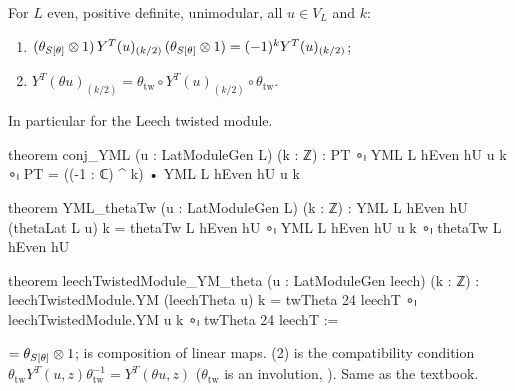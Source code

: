 \begin{theorem}\label{ch08:thm:thetastable}
For $L$ even, positive definite, unimodular, all $u\in V_L$ and $k$:
\begin{enumerate}
\item $(\theta_{S[\theta]}\otimes1)\,Y^T(u)_{(k/2)}\,(\theta_{S[\theta]}\otimes1)=(-1)^kY^T(u)_{(k/2)}$;
\item $Y^T(\theta u)_{(k/2)}=\theta_{\mathrm{tw}}\circ Y^T(u)_{(k/2)}\circ\theta_{\mathrm{tw}}$.
\end{enumerate}
In particular for the Leech twisted module.
\end{theorem}
\begin{leancode}
theorem conj_YML (u : LatModuleGen L) (k : ℤ) :
    PT ∘ₗ YML L hEven hU u k ∘ₗ PT = ((-1 : ℂ) ^ k) • YML L hEven hU u k

theorem YML_thetaTw (u : LatModuleGen L) (k : ℤ) :
    YML L hEven hU (thetaLat L u) k
      = thetaTw L hEven hU ∘ₗ YML L hEven hU u k ∘ₗ thetaTw L hEven hU

theorem leechTwistedModule_YM_theta (u : LatModuleGen leech) (k : ℤ) :
    leechTwistedModule.YM (leechTheta u) k
      = twTheta 24 leechT ∘ₗ leechTwistedModule.YM u k ∘ₗ twTheta 24 leechT :=
\end{leancode}
\begin{dictionary}
 $=\theta_{S[\theta]}\otimes1$;  is composition of linear maps.  (2) is the
compatibility condition $\theta_{\mathrm{tw}}Y^T(u,z)\theta_{\mathrm{tw}}^{-1}=Y^T(\theta u,z)$
($\theta_{\mathrm{tw}}$ is an involution, ).  Same as the textbook.
\end{dictionary}


